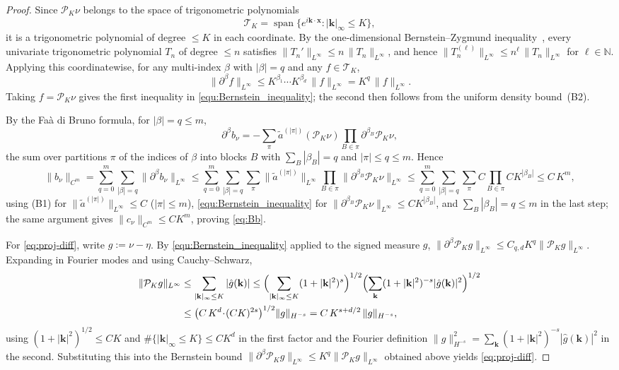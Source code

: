 \documentclass[a4paper,fleqn]{cas-sc}
\theoremstyle{definition}
\theoremstyle{remark}
\begin{document}
\begin{proof}
Since $\mathcal P_K\nu$ belongs to the space of trigonometric polynomials
\[
\mathcal T_K=\operatorname{span}\bigl\{e^{i\mathbf k\cdot\mathbf x}
:|\mathbf k|_\infty\le K\bigr\},
\]
it is a trigonometric polynomial of degree $\le K$ in each coordinate. By the
one-dimensional Bernstein--Zygmund inequality~\cite[Theorem~3.13,
Chapter~X]{zygmund2002trigonometric}, every univariate trigonometric polynomial
$T_n$ of degree $\le n$ satisfies $\|T_n'\|_{L^\infty}\le n\,\|T_n\|_{L^\infty}$,
and hence $\|T_n^{(\ell)}\|_{L^\infty}\le n^{\ell}\,\|T_n\|_{L^\infty}$ for
$\ell\in\mathbb N$. Applying this coordinatewise, for any multi-index $\beta$ with
$|\beta|=q$ and any $f\in\mathcal T_K$,
\[
\|\partial^\beta f\|_{L^\infty}
\le K^{\beta_1}\cdots K^{\beta_d}\,\|f\|_{L^\infty}
=K^{q}\,\|f\|_{L^\infty}.
\]
Taking $f=\mathcal P_K\nu$ gives the first inequality in
\eqref{equ:Bernstein_inequality}; the second then follows from the uniform
density bound~(B2).

By the Fa\`a di Bruno formula, for $|\beta|=q\le m$,
\[
\partial^\beta b_\nu
=-\sum_{\pi}\tilde a^{(|\pi|)}(\mathcal P_K\nu)\prod_{B\in\pi}\partial^{\beta_B}\mathcal P_K\nu,
\]
the sum over partitions $\pi$ of the indices of $\beta$ into blocks $B$ with
$\sum_B|\beta_B|=q$ and $|\pi|\le q\le m$. Hence
\[
\|b_\nu\|_{C^m}
=\sum_{q=0}^{m}\sum_{|\beta|=q}\|\partial^\beta b_\nu\|_{L^\infty}
\le\sum_{q=0}^{m}\sum_{|\beta|=q}\sum_{\pi}\|\tilde a^{(|\pi|)}\|_{L^\infty}
   \prod_{B\in\pi}\|\partial^{\beta_B}\mathcal P_K\nu\|_{L^\infty}
\le\sum_{q=0}^{m}\sum_{|\beta|=q}\sum_{\pi}C\prod_{B\in\pi}CK^{|\beta_B|}
\le C\,K^{m},
\]
using (B1) for $\|\tilde a^{(|\pi|)}\|_{L^\infty}\le C$ ($|\pi|\le m$),
\eqref{equ:Bernstein_inequality} for $\|\partial^{\beta_B}\mathcal P_K\nu\|_{L^\infty}
\le CK^{|\beta_B|}$, and $\sum_B|\beta_B|=q\le m$ in the last step; the same
argument gives $\|c_\nu\|_{C^m}\le CK^m$, proving \eqref{eq:Bb}.

For \eqref{eq:proj-diff}, write $g:=\nu-\eta$. By
\eqref{equ:Bernstein_inequality} applied to the signed measure $g$,
$\|\partial^\beta\mathcal P_K g\|_{L^\infty}\le C_{q,d}K^{q}\|\mathcal P_K g\|_{L^\infty}$.
Expanding in Fourier modes and using Cauchy--Schwarz,
\[
\begin{aligned}
\|\mathcal P_K g\|_{L^\infty}
&\le\sum_{|\mathbf k|_\infty\le K}|\hat g(\mathbf k)|
\le\Bigl(\sum_{|\mathbf k|_\infty\le K}(1+|\mathbf k|^2)^{s}\Bigr)^{1/2}
   \Bigl(\sum_{\mathbf k}(1+|\mathbf k|^2)^{-s}|\hat g(\mathbf k)|^2\Bigr)^{1/2}\\
&\le\bigl(C\,K^d\!\cdot\!(CK)^{2s}\bigr)^{1/2}\|g\|_{H^{-s}}
=C\,K^{s+d/2}\,\|g\|_{H^{-s}},
\end{aligned}
\]
using $(1+|\mathbf k|^2)^{1/2}\le CK$ and $\#\{|\mathbf k|_\infty\le K\}\le CK^d$
in the first factor and the Fourier definition
$\|g\|_{H^{-s}}^2=\sum_{\mathbf k}(1+|\mathbf k|^2)^{-s}|\hat g(\mathbf k)|^2$ in
the second. Substituting this into the Bernstein bound
$\|\partial^\beta\mathcal P_K g\|_{L^\infty}\le K^{q}\|\mathcal P_K g\|_{L^\infty}$
obtained above yields \eqref{eq:proj-diff}.


\end{proof}
\end{document}
